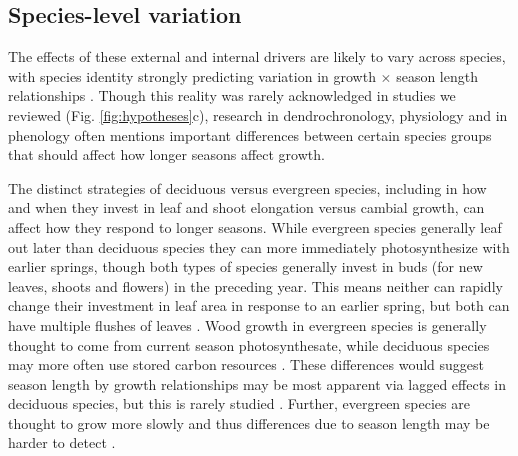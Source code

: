 \documentclass[11pt]{article}
\begin{document}
\subsection*{Species-level variation}
The effects of these external and internal drivers are likely to vary across species, with species identity strongly predicting variation in growth $\times$ season length relationships \citep[e.g.][]{cuny2012life,michelot2012comparing}. Though this reality was rarely acknowledged in studies we reviewed (Fig. \ref{fig:hypotheses}c), research in dendrochronology, physiology and in phenology often mentions important differences between certain species groups that should affect how longer seasons affect growth. 

The distinct strategies of deciduous versus evergreen species, including in how and when they invest in leaf and shoot elongation versus cambial growth, can affect how they respond to longer seasons. While evergreen species generally leaf out later than deciduous species they can more immediately photosynthesize with earlier springs, though both types of species generally invest in buds (for new leaves, shoots and flowers) in the preceding year. This means neither can rapidly change their investment in leaf area in response to an earlier spring, but both can have multiple flushes of leaves \citep{day2011regulation,soolanayakanahally2013timing}. Wood growth in evergreen species is generally thought to come from current season photosynthesate, while deciduous species may more often use stored carbon resources \citep{gordon1968seasonal,monson2018finding}. These differences would suggest season length by growth relationships
may be most apparent via lagged effects in deciduous species, but this is rarely studied  \citep[and not clearly supported to date][]{coulthard2020limits,klesse2023legacy}. Further, evergreen species are thought to grow more slowly and thus differences due to season length may be harder to detect \citep{waring1979evergreen}.  
\end{document}
